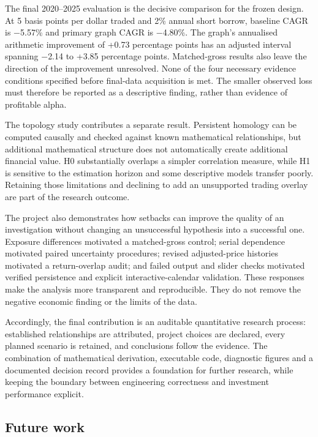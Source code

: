 \documentclass[12pt,a4paper,oneside]{article}
\begin{document}
The final 2020–2025 evaluation is the decisive comparison for the frozen design. At 5 basis points per dollar traded and 2\% annual short borrow, baseline CAGR is \( - \)5.57\% and primary graph CAGR is \( - \)4.80\%. The graph's annualised arithmetic improvement of +0.73 percentage points has an adjusted interval spanning \( - \)2.14 to +3.85 percentage points. Matched-gross results also leave the direction of the improvement unresolved. None of the four necessary evidence conditions specified before final-data acquisition is met. The smaller observed loss must therefore be reported as a descriptive finding, rather than evidence of profitable alpha.


The topology study contributes a separate result. Persistent homology can be computed causally and checked against known mathematical relationships, but additional mathematical structure does not automatically create additional financial value. H0 substantially overlaps a simpler correlation measure, while H1 is sensitive to the estimation horizon and some descriptive models transfer poorly. Retaining those limitations and declining to add an unsupported trading overlay are part of the research outcome.


The project also demonstrates how setbacks can improve the quality of an investigation without changing an unsuccessful hypothesis into a successful one. Exposure differences motivated a matched-gross control; serial dependence motivated paired uncertainty procedures; revised adjusted-price histories motivated a return-overlap audit; and failed output and slider checks motivated verified persistence and explicit interactive-calendar validation. These responses make the analysis more transparent and reproducible. They do not remove the negative economic finding or the limits of the data.


Accordingly, the final contribution is an auditable quantitative research process: established relationships are attributed, project choices are declared, every planned scenario is retained, and conclusions follow the evidence. The combination of mathematical derivation, executable code, diagnostic figures and a documented decision record provides a foundation for further research, while keeping the boundary between engineering correctness and investment performance explicit.


\subsection{Future work}
\end{document}
